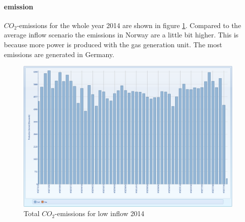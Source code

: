 \documentclass{article}
\begin{document}
\paragraph{emission\\}
$CO_2$-emissions for the whole year 2014 are shown in figure \ref{fig:MTemissionsdry}. Compared to the average inflow scenario the emissions in Norway are a little bit higher. This is because more power is produced with the gas generation unit. The most emissions are generated in Germany.
\begin{figure}[htbp]
\begin{center}
\includegraphics[width=13cm,keepaspectratio=true]{figures/drycase/MTCO2dry}
\caption{Total $CO_2$-emissions for low inflow 2014}
\label{fig:MTemissionsdry}
\end{center}
\end{figure}
\end{document}
